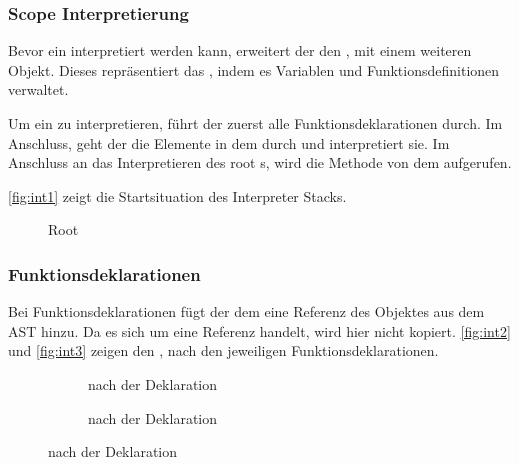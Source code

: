 {    \subsubsection{Scope Interpretierung}
    \label{sssec:Scope Interpretierung}
      Bevor ein  interpretiert werden kann, erweitert der  den , mit einem weiteren  Objekt. Dieses repräsentiert das , indem es Variablen und Funktionsdefinitionen verwaltet.

      Um ein  zu interpretieren, führt der  zuerst alle Funktionsdeklarationen durch. Im Anschluss, geht der  die  Elemente in dem  durch und interpretiert sie. Im Anschluss an das Interpretieren des root s, wird die  Methode von dem  aufgerufen.

      \autoref{fig:int1} zeigt die Startsituation des Interpreter Stacks.
      \begin{figure}[H]
        \centering
        \caption{Root }
        \label{fig:int1}
      \end{figure}

    \subsubsection{Funktionsdeklarationen}
    \label{sssec:Funktionsdeklarationen}
      Bei Funktionsdeklarationen fügt der  dem  eine Referenz des  Objektes aus dem AST hinzu. Da es sich um eine Referenz handelt, wird hier nicht kopiert. \autoref{fig:int2} und \autoref{fig:int3} zeigen den , nach den jeweiligen Funktionsdeklarationen.
      \begin{figure}[H]
        \centering
        \begin{minipage}{.45\linewidth}
            \begin{figure}[H]
              \centering
              \caption{ nach der  Deklaration}
              \label{fig:int2}
            \end{figure}
        \end{minipage}%
        \begin{minipage}{.45\linewidth}
          \begin{figure}[H]
            \centering
            \caption{ nach der  Deklaration}
            \label{fig:int3}
          \end{figure}
        \end{minipage}
      \end{figure}


}
